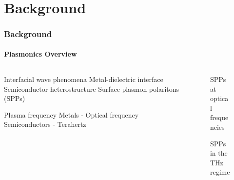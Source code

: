 \documentclass[mathserif,16pt,xcolor=table]{beamer}
\begin{document}
  \section{Background}
  \begin{frame}
    \frametitle{Background}
    \framesubtitle{Plasmonics Overview}
    \begin{columns} %
      \begin{column}{.5\textwidth}
        \begin{outline}[itemize]
          \1 Interfacial wave phenomena
            \2 Metal-dielectric interface
            \2 Semiconductor heterostructure
          \1 Surface plasmon polaritons (SPPs)
        \end{outline}
        \begin{outline}[itemize]
          \1 Plasma frequency
          \2 Metals - Optical frequency
          \2 Semiconductors - Terahertz
        \end{outline}
      \end{column}
      \begin{column}{.5\textwidth}
        \begin{figure}
          \centering
          \fontsize{6}{7}\selectfont%
          \def\svgwidth{.8\linewidth}
          
          \label{fig:spp}
          \caption{SPPs at optical frequencies}
        \end{figure}
        \begin{figure}
          \centering
          \fontsize{6}{7}\selectfont
          \def\svgwidth{.8\linewidth}
          
          \label{fig:spp_2deg}
          \caption{SPPs in the THz regime}
        \end{figure}
        \end{column}%
      \end{columns}
    \end{frame}
\end{document}

